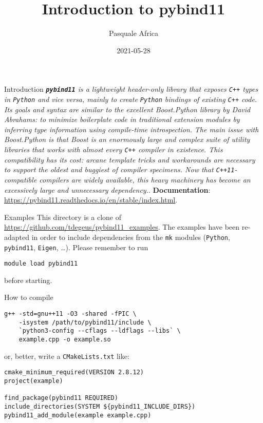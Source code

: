 \documentclass[aspectratio=169,11pt]{beamer}
\title{Introduction to pybind11}
\author{Pasquale Africa}
\institute{Politecnico di Milano}
\date{2021-05-28}
\begin{document}
\begin{frame}[plain]{}
    \maketitle
\end{frame}

\begin{frame}{Introduction}
    \textit{\textbf{\texttt{pybind11}} is a lightweight header-only library that exposes \texttt{C++} types in \texttt{Python} and vice versa, mainly to create \texttt{Python} bindings of existing \texttt{C++} code.}
    \vfill
    \textit{Its goals and syntax are similar to the excellent Boost.Python library by David Abrahams: to minimize boilerplate code in traditional extension modules by inferring type information using compile-time introspection.}
    \vfill
    \textit{The main issue with Boost.Python is that Boost is an enormously large and complex suite of utility libraries that works with almost every \texttt{C++} compiler in existence. This compatibility has its cost: arcane template tricks and workarounds are necessary to support the oldest and buggiest of compiler specimens. Now that \texttt{C++11}-compatible compilers are widely available, this heavy machinery has become an excessively large and unnecessary dependency.}.
    \vfill
    \textbf{Documentation}: \url{https://pybind11.readthedocs.io/en/stable/index.html}.
\end{frame}

\begin{frame}[fragile]{Examples}
    This directory is a clone of \url{https://github.com/tdegeus/pybind11_examples}.
    \vfill
    The examples have been re-adapted in order to include dependencies from the \texttt{mk} modules (\texttt{Python}, \texttt{pybind11}, \texttt{Eigen}, \dots).
    \vfill
    Please remember to run
    \begin{verbatim}
module load pybind11
    \end{verbatim}
    before starting.
\end{frame}

\begin{frame}[fragile]{How to compile}
    \begin{verbatim}
g++ -std=gnu++11 -O3 -shared -fPIC \
    -isystem /path/to/pybind11/include \
    `python3-config --cflags --ldflags --libs` \
    example.cpp -o example.so
    \end{verbatim}
    or, better, write a \texttt{CMakeLists.txt} like:
    \begin{verbatim}
cmake_minimum_required(VERSION 2.8.12)
project(example)

find_package(pybind11 REQUIRED)
include_directories(SYSTEM ${pybind11_INCLUDE_DIRS})
pybind11_add_module(example example.cpp)
    \end{verbatim}
\end{frame}
\end{document}
